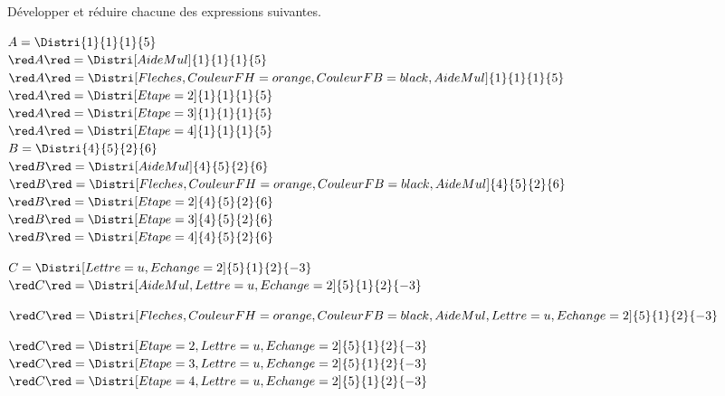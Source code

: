 \begin{corrige}
    Développer et réduire chacune des expressions suivantes.

    \begin{itemize}
        \def\item{}
        \item $A=\Distri{1}{1}{1}{5}$\\        
        ${\red A}{\red = \Distri[AideMul]{1}{1}{1}{5}}$\\\bigskip        
        ${\red A}{\red =\Distri[Fleches,CouleurFH=orange,CouleurFB=black,AideMul]{1}{1}{1}{5}}$\\\bigskip
        ${\red A}{\red =\Distri[Etape=2]{1}{1}{1}{5}}$\\
        ${\red A}{\red =\Distri[Etape=3]{1}{1}{1}{5}}$\\
        ${\red A}{\red =\Distri[Etape=4]{1}{1}{1}{5}}$\\\bigskip
        \item $B=\Distri{4}{5}{2}{6}$\\        
        ${\red B}{\red = \Distri[AideMul]{4}{5}{2}{6}}$\\\bigskip        
        ${\red B}{\red =\Distri[Fleches,CouleurFH=orange,CouleurFB=black,AideMul]{4}{5}{2}{6}}$\\\bigskip
        ${\red B}{\red =\Distri[Etape=2]{4}{5}{2}{6}}$\\
        ${\red B}{\red =\Distri[Etape=3]{4}{5}{2}{6}}$\\
        ${\red B}{\red =\Distri[Etape=4]{4}{5}{2}{6}}$\\
    \end{itemize}
    \Coupe
    \begin{itemize}
        \def\item{}
        \item $C=\Distri[Lettre=u,Echange=2]{5}{1}{2}{-3}$\\
        ${\red C}{\red = \Distri[AideMul,Lettre=u,Echange=2]{5}{1}{2}{-3}}$

        \bigskip
        ${\red C}{\red =\Distri[Fleches,CouleurFH=orange,CouleurFB=black,AideMul,Lettre=u,Echange=2]{5}{1}{2}{-3}}$
        
        \bigskip
        ${\red C}{\red =\Distri[Etape=2,Lettre=u,Echange=2]{5}{1}{2}{-3}}$\\
        ${\red C}{\red =\Distri[Etape=3,Lettre=u,Echange=2]{5}{1}{2}{-3}}$\\
        ${\red C}{\red =\Distri[Etape=4,Lettre=u,Echange=2]{5}{1}{2}{-3}}$
        

\end{itemize}
\end{corrige}
